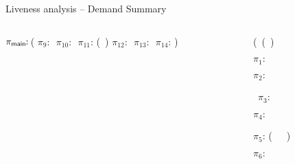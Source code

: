 \documentclass[xcolor=x11names,compress,mathserif]{beamer}
\renewcommand{\(}{\begin{columns}}
\renewcommand{\)}{\end{columns}}
\newcommand{\<}[1]{\begin{column}{#1}}
\renewcommand{\>}{\end{column}}
\begin{document}
\begin{frame}{Liveness analysis -- Demand Summary}

\small
\begin{columns}[c]
 \begin{column}[T]{0.45\textwidth}
   \hspace*{-.3cm}\renewcommand{\arraystretch}{1}{
     \begin{uprogram}
       \hspace*{-.4cm} $\pi_{\sf main}\!\!:\, $(
          \hspace*{-.3cm}   $\pi_9\!\!:\, $
          \hspace*{-.3cm}   $\pi_{10}\!\!:\, $
          \hspace*{-.35cm} $\pi_{11}\!\!:\, $(\plength\ \pz) 
          \hspace*{-.38cm}  $\pi_{12}\!\!:\, $
          \hspace*{-.35cm}  $\pi_{13}\!\!:\, $
          \hspace*{-.38cm} $\pi_{14}\!\!:\,$)
   \end{uprogram}}
 \end{column}
 \begin{column}[T]{0.60\textwidth}
\hspace*{.4cm}  \renewcommand{\arraystretch}{1}{
  \begin{uprogram}
      (\DEFINE\ (\plength~\lista)

      $\pi_1\!\!:\, $


         $\pi_2\!\!:\, $

~$\pi_3\!\!:$
 
           \hspace*{-.05cm}    
 $\pi_4\!\!:\, $

	    \hspace*{-.05cm}
          $\pi_5\!\!:\,$(\plength\ \ \xtl\ ) 


           \hspace*{-.05cm}   $\pi_6\!\!:\, $



\end{uprogram}}
\end{column}
\end{columns}
\end{frame}
\end{document}
